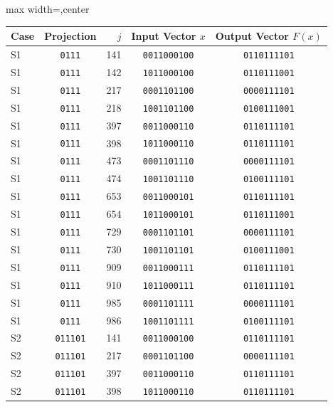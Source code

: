\documentclass[11pt]{article}
\theoremstyle{definition}
\begin{document}
\begin{table}[H]
\centering
\setlength{\tabcolsep}{4pt}
\footnotesize
\begin{adjustbox}{max width=\textwidth,center}
\begin{tabular}{@{}lcrcc@{}}
\toprule
Case & Projection & \(j\) & Input Vector \(x\) & Output Vector \(F(x)\)\\
\midrule
S1 & \texttt{0111} & 141 & \texttt{0011000100} & \texttt{0110111101} \\
S1 & \texttt{0111} & 142 & \texttt{1011000100} & \texttt{0110111001} \\
S1 & \texttt{0111} & 217 & \texttt{0001101100} & \texttt{0000111101} \\
S1 & \texttt{0111} & 218 & \texttt{1001101100} & \texttt{0100111001} \\
S1 & \texttt{0111} & 397 & \texttt{0011000110} & \texttt{0110111101} \\
S1 & \texttt{0111} & 398 & \texttt{1011000110} & \texttt{0110111101} \\
S1 & \texttt{0111} & 473 & \texttt{0001101110} & \texttt{0000111101} \\
S1 & \texttt{0111} & 474 & \texttt{1001101110} & \texttt{0100111101} \\
S1 & \texttt{0111} & 653 & \texttt{0011000101} & \texttt{0110111101} \\
S1 & \texttt{0111} & 654 & \texttt{1011000101} & \texttt{0110111001} \\
S1 & \texttt{0111} & 729 & \texttt{0001101101} & \texttt{0000111101} \\
S1 & \texttt{0111} & 730 & \texttt{1001101101} & \texttt{0100111001} \\
S1 & \texttt{0111} & 909 & \texttt{0011000111} & \texttt{0110111101} \\
S1 & \texttt{0111} & 910 & \texttt{1011000111} & \texttt{0110111101} \\
S1 & \texttt{0111} & 985 & \texttt{0001101111} & \texttt{0000111101} \\
S1 & \texttt{0111} & 986 & \texttt{1001101111} & \texttt{0100111101} \\
S2 & \texttt{011101} & 141 & \texttt{0011000100} & \texttt{0110111101} \\
S2 & \texttt{011101} & 217 & \texttt{0001101100} & \texttt{0000111101} \\
S2 & \texttt{011101} & 397 & \texttt{0011000110} & \texttt{0110111101} \\
S2 & \texttt{011101} & 398 & \texttt{1011000110} & \texttt{0110111101} \\

\end{tabular}
\end{adjustbox}
\end{table}
\end{document}
